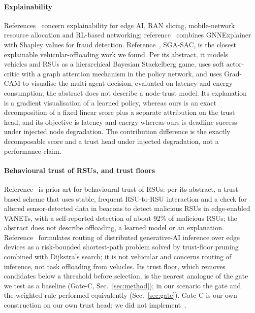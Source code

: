 \paragraph*{Explainability}
References~\cite{r6,r7,r8,r9} concern explainability for edge AI, RAN slicing, mobile-network resource allocation and RL-based networking; reference~\cite{r10} combines GNNExplainer with Shapley values for fraud detection.
Reference~\cite{r11}, SGA-SAC, is the closest explainable vehicular-offloading work we found.
Per its abstract, it models vehicles and RSUs as a hierarchical Bayesian Stackelberg game, uses soft actor-critic with a graph attention mechanism in the policy network, and uses Grad-CAM to visualise the multi-agent decision, evaluated on latency and energy consumption; the abstract does not describe a node-trust model.
Its explanation is a gradient visualisation of a learned policy, whereas ours is an exact decomposition of a fixed linear score plus a separate attribution on the trust head, and its objective is latency and energy whereas ours is deadline success under injected node degradation.
The contribution difference is the exactly decomposable score and a trust head under injected degradation, not a performance claim.

\paragraph*{Behavioural trust of RSUs, and trust floors}
Reference~\cite{r12} is prior art for behavioural trust of RSUs: per its abstract, a trust-based scheme that uses stable, frequent RSU-to-RSU interaction and a check for altered sensor-detected data in beacons to detect malicious RSUs in edge-enabled VANETs, with a self-reported detection of about 92\% of malicious RSUs; the abstract does not describe offloading, a learned model or an explanation.
Reference~\cite{r13} formulates routing of distributed generative-AI inference over edge devices as a risk-bounded shortest-path problem solved by trust-floor pruning combined with Dijkstra's search; it is not vehicular and concerns routing of inference, not task offloading from vehicles.
Its trust floor, which removes candidates below a threshold before selection, is the nearest analogue of the gate we test as a baseline (Gate-C, Sec.~\ref{sec:method}); in our scenario the gate and the weighted rule performed equivalently (Sec.~\ref{sec:gate}).
Gate-C is our own construction on our own trust head; we did not implement~\cite{r13}.
